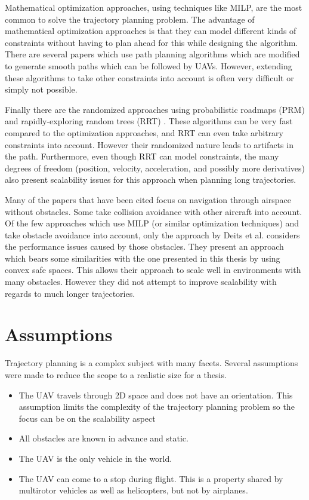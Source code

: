 \par
Mathematical optimization approaches, using techniques like MILP, are the most common to solve the trajectory planning problem. The advantage of mathematical optimization approaches is that they can model different kinds of constraints without having to plan ahead for this while designing the algorithm. There are several papers \cite{Jung2008}\cite{Askari2016}\cite{Gao2013}\cite{DeFilippis2012} which use path planning algorithms which are modified to generate smooth paths which can be followed by UAVs. However, extending these algorithms to take other constraints into account is often very difficult or simply not possible.
\par
Finally there are the randomized approaches using probabilistic roadmaps (PRM)\cite{Naderi2015} \cite{Kavraki1996}\cite{Saha2006} and rapidly-exploring random trees (RRT) \cite{LaValle1998}\cite{Tsai2015}\cite{Naderi2015}. These algorithms can be very fast compared to the optimization approaches, and RRT can even take arbitrary constraints into account. However their randomized nature leads to artifacts in the path. Furthermore, even though RRT can model constraints, the many degrees of freedom  (position, velocity, acceleration, and possibly more derivatives) also present scalability issues for this approach when planning long trajectories.
\par
Many of the papers that have been cited focus on navigation through airspace without obstacles. Some take collision avoidance with other aircraft into account. Of the few approaches which use MILP (or similar optimization techniques) and take obstacle avoidance into account, only the approach by Deits et al. \cite{Deits2015} considers the performance issues caused by those obstacles. They present an approach which bears some similarities with the one presented in this thesis by using convex safe spaces. This allows their approach to scale well in environments with many obstacles. However they did not attempt to improve scalability with regards to much longer trajectories.

\section{Assumptions}
Trajectory planning is a complex subject with many facets. Several assumptions were made to reduce the scope to a realistic size for a thesis.
\begin{itemize}
\item The UAV travels through 2D space and does not have an orientation. This assumption limits the complexity of the trajectory planning problem so the focus can be on the scalability aspect 
\item All obstacles are known in advance and static.
\item The UAV is the only vehicle in the world.
\item The UAV can come to a stop during flight. This is a property shared by multirotor vehicles as well as helicopters, but not by airplanes.
\end{itemize}